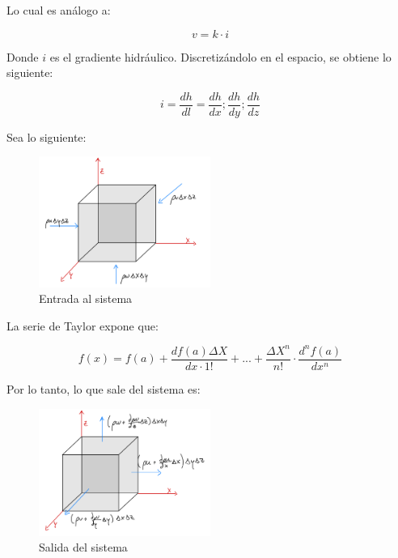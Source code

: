 Lo cual es análogo a:

\begin{equation}
    v = k \cdot i
\end{equation}

Donde \(i\) es el gradiente hidráulico. Discretizándolo en el espacio, se obtiene lo siguiente:

\begin{equation}
    i = \frac{dh}{dl} = \frac{dh}{dx}; \frac{dh}{dy}; \frac{dh}{dz}
\end{equation}

Sea lo siguiente:

\begin{figure}[H]
    \centering
    \includegraphics[width=0.5\textwidth]{FOTOS/in.jpg}
    \caption{Entrada al sistema}
    \label{fig:ley_darcy_in}
\end{figure}

La serie de Taylor expone que:

\begin{equation}
    f(x) = f(a) + \frac{df(a) \Delta X}{dx \cdot 1!} + ... + \frac{\Delta X^n}{n!} \cdot \frac{d^n f(a)}{dx^n}
\end{equation}

Por lo tanto, lo que sale del sistema es:

\begin{figure}[H]
    \centering
    \includegraphics[width=0.5\textwidth]{FOTOS/out.jpg}
    \caption{Salida del sistema}
    \label{fig:ley_darcy_out}
\end{figure}

